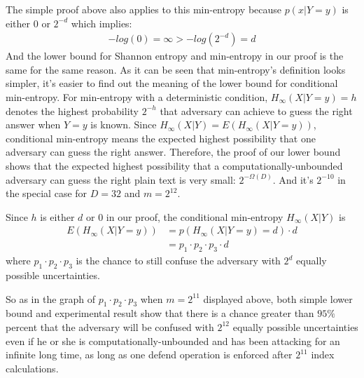 \documentclass[10pt, conference, compsocconf]{IEEEtran}
\begin{document}
	The simple proof above also applies to this min-entropy
	because $p(x | Y = y)$ is either $0$ or $2^{-d}$ which implies:
	\begin{align*}
		-log(0) = \infty > -log(2^{-d}) = d
	\end{align*}
	And the lower bound for Shannon entropy and min-entropy 
	in our proof is the same for the same reason.
	As it can be seen that min-entropy's definition looks simpler, 
	it's easier to find out the meaning of the lower
	bound for conditional min-entropy. For min-entropy with a deterministic condition,
	$H_\infty(X | Y = y) = h$
	denotes the highest probability $2^{-h}$ that adversary can achieve to guess
	the right answer when $Y = y$ is known.
	Since $H_\infty(X | Y) = E\left(H_\infty(X | Y = y)\right)$,
	conditional min-entropy means the expected highest
	possibility that one adversary can guess the right answer.
	Therefore, the proof of our lower bound shows that
	the expected highest possibility that a computationally-unbounded
	adversary can guess the right plain text is very small: $2^{-\Omega(D)}$.
	And it's $2^{-10}$ in the special case for $D = 32$ and $m = 2^{12}$.
	
	Since $h$ is either $d$ or $0$ in our proof,
	the conditional min-entropy $H_\infty(X | Y)$ is
	\begin{align*}
		E\left(H_\infty(X | Y = y)\right) &= p\left(H_\infty(X | Y = y) = d\right) \cdot d\\
		 &= p_1 \cdot p_2 \cdot p_3 \cdot d
	\end{align*}
	where $p_1 \cdot p_2 \cdot p_3$ is the chance to still confuse the adversary with 
	$2^d$ equally possible uncertainties.
	
	So as in the graph of $p_1 \cdot p_2 \cdot p_3$ when 
	$m = 2^{11}$ displayed above, both simple lower
	bound and experimental result show that
	there is a chance greater than $95\%$ percent that the adversary
	will be confused with $2^{12}$ equally possible uncertainties
	even if he or she is computationally-unbounded and has been attacking
	for an infinite long time, as long as one defend operation is enforced
	after $2^{11}$ index calculations.

%
%
\end{document}
